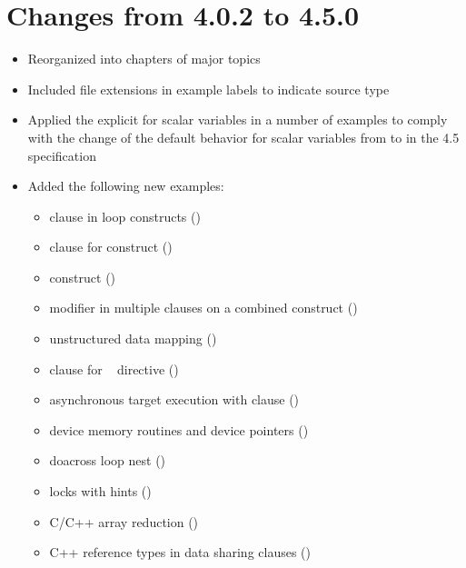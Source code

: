 \section{Changes from 4.0.2 to 4.5.0}
\begin{itemize}
\item Reorganized into chapters of major topics
\item Included file extensions in example labels to indicate source type
\item Applied the explicit  for scalar variables 
      in a number of examples to comply with 
      the change of the default behavior for scalar variables from 
       to  in the 4.5 specification
\item Added the following new examples:

\begin{itemize}
\item {} clause in loop constructs     ()
\item {} clause for  construct ()
\item {} construct                   ()
\item {} modifier in multiple  clauses on
a combined construct                              ()
\item unstructured data mapping                   ()
\item {} clause for ~ directive 
                                                  ()
\item asynchronous target execution with  clause ()
\item device memory routines and device pointers  ()
\item doacross loop nest                          ()
\item locks with hints                            ()
\item C/C++ array reduction                       ()
\item C++ reference types in data sharing clauses ()
\end{itemize}

\end{itemize}

